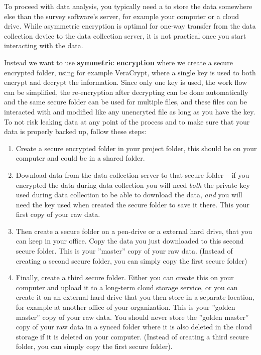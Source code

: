 To proceed with data analysis, you typically need a to store the data somewhere else 
than the survey software's server, for example your computer or a cloud drive. While 
asymmetric encryption is optimal for one-way transfer from the data collection device
to the data collection server, it is not practical once you start interacting with the data.

Instead we want to use \textbf{symmetric encryption} where we 
create a secure encrypted folder, using for example VeraCrypt, 
where a single key is used to both encrypt and decrypt the information. Since only one 
key is used, the work flow can be simplified, the re-encryption after decrypting can 
be done automatically and the same secure folder can be used for multiple files, and 
these files can be interacted with and modified like any unencryted file as long as you
have the key. To not risk leaking data at any point of the process and to make sure that
your data is properly backed up, follow these steps:

\begin{enumerate}
	\item Create a secure encrypted folder in your project folder, this should be on
	your computer and could be in a shared folder.
	\item Download data from the data collection server to that secure folder -- if 
	you encrypted the data during data collection you will need \textit{both} the 
	private key used during data collection to be able to download the data, \textit{and}
	you will need the key used when created the secure folder to save it there. This
	your first copy of your raw data.
	\item Then create a secure folder on a pen-drive or a external hard drive, that you
	can keep in your office. Copy the data you just downloaded to this second secure 
	folder. This is your ''master'' copy of your raw data. (Instead of creating a second
	secure folder, you can simply copy the first secure folder)
	\item Finally, create a third secure folder. Either you can create this on your 
	computer and upload it to a long-term cloud storage service, or you can create it on 
	an external hard drive that you then store in a separate location, for example at 
	another office of your organization. This is your ''golden master'' copy of your raw 
	data. You should never store the ''golden master'' copy of your raw data in a synced 
	folder where it is also deleted in the cloud storage if it is deleted on your computer.
	(Instead of creating a third secure folder, you can simply copy the first secure folder).
\end{enumerate}

